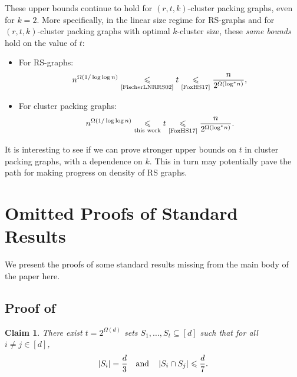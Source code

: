 \documentclass[11pt]{article}
\newtheorem*{claim*}{Claim}
\theoremstyle{definition}
\newcommand{\logstar}[1]{\ensuremath{\log^{*}\!{#1}}}
\renewcommand{\leq}{\leqslant}
\newcommand{\card}[1]{\left\vert{#1}\right\vert}
\begin{document}
These upper bounds continue to hold for $(r,t,k)$-cluster packing graphs, even for $k = 2$. 
More specifically, in the linear size regime for RS-graphs and for $(r,t,k)$-cluster packing graphs with optimal $k$-cluster size, these \emph{same bounds} hold on the value of $t$:
\begin{itemize}
	\item For RS-graphs:
	\begin{align*}
		n^{\Omega(1/\log \log n)} \underset{\textnormal{\cite{FischerLNRRS02}}}{\leq} t \underset{\textnormal{\cite{FoxHS17}}}{\leq} \frac{n}{2^{\Omega(\logstar{n})}},
	\end{align*}
	\item For cluster packing graphs:
	\begin{align*}
		n^{\Omega(1/\log \log n)} \underset{\textnormal{this work}}{\leq} t \underset{\textnormal{\cite{FoxHS17}}}{\leq} \frac{n}{2^{\Omega(\logstar{n})}}.
	\end{align*}
\end{itemize}

It is interesting to see if we can prove stronger upper bounds on $t$ in cluster packing graphs, with a dependence on $k$. This in turn may potentially pave the path for making progress on density of RS graphs. %

\clearpage


\section{Omitted Proofs of Standard Results}\label{app:missing}

We present the proofs of some standard results missing from the main body of the paper here. 

\subsection{Proof of~}\label{sec:claim:num-of-sets}

\begin{claim*}
        There exist $t=2^{\Omega(d)}$ sets $S_1, \ldots, S_t\subseteq [d]$ such that for all $i \neq j \in [d]$, 
        \[
        		\card{S_i} = \frac{d}{3} \quad \textnormal{and} \quad \card{S_i \cap S_j} \leq \frac{d}{7}.
	\]
\end{claim*}
\end{document}
